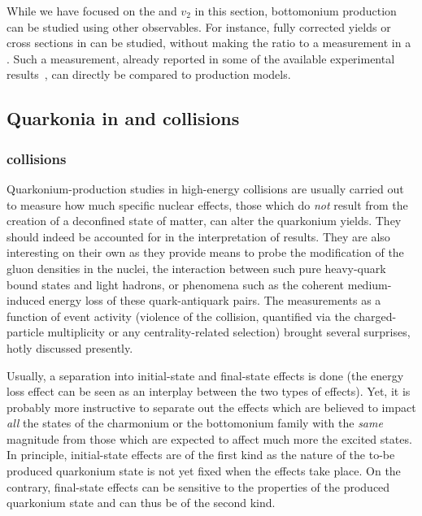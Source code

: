 \documentclass[../report.tex]{subfiles}
\begin{document}
While we have focused on the \raa and $v_2$ in this section, bottomonium production can be studied using other observables. For instance, fully corrected yields or cross sections
in \PbPb can be studied, without making the ratio to a \pp measurement in a \raa. Such a measurement, already reported in some of the available experimental results~\cite{Sirunyan:2018nsz},
can directly be compared to production models. 



\subsection{Quarkonia in \pPb and \pp collisions}%

\subsubsection{\pPb collisions} %
Quarkonium-production studies in high-energy \pPb collisions are usually carried out to measure how much specific nuclear effects, those which do {\it not} result from the creation of a deconfined state of matter, can alter the quarkonium yields. They should indeed be accounted for in the interpretation of \PbPb  results. They are also interesting on their own as they provide means to probe the modification of the gluon densities in the nuclei, the interaction between such pure heavy-quark bound states and light hadrons, or phenomena such as the coherent medium-induced energy loss of these quark-antiquark pairs.
The measurements as a function of event activity (violence of the collision, quantified via the charged-particle multiplicity or any centrality-related selection) brought several surprises, hotly discussed presently.
 
 Usually, a separation into initial-state and final-state effects is done (the energy loss effect can be seen as an interplay between the two types of effects). Yet, it is probably more instructive to separate out the effects which are believed to impact {\it all} the states of the charmonium or the bottomonium family with the {\it same} magnitude
 from those which are expected to affect much more the excited states. In principle, initial-state effects are of the first kind as the nature of the to-be produced quarkonium state is not yet fixed when the effects take place.  On the contrary, final-state effects can be sensitive to the properties of the produced quarkonium state and can thus be of the second kind.
 
\end{document}
